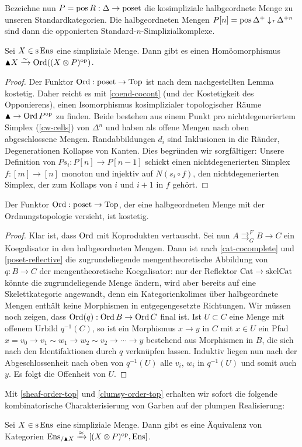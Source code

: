 Bezeichne nun $P = \operatorname{pos} R: \Delta \to \operatorname{poset}$ die kosimpliziale
halbgeordnete Menge zu unseren Standardkategorien. Die halbgeordneten
Mengen $P[n] = \operatorname{pos} \Delta^+ \downarrow \! {\scriptstyle r} \, \Delta^{+n}$ sind dann die
opponierten Standard-$n$-Simplizialkomplexe.
\begin{prop} \label{clumsy-order-top}
  Sei $X \in \operatorname{s}\operatorname{Ens}$ eine simpliziale Menge. Dann gibt es einen
  Homöomorphismus $\blacktriangle X \xrightarrow[]{\sim} \operatorname{Ord}((X \otimes P)^\mathrm{op})$.
\end{prop}
\begin{proof}
  Der Funktor $\operatorname{Ord}: \operatorname{poset} \to \operatorname{Top}$ ist nach dem nachgestellten
  Lemma kostetig. Daher reicht es mit \ref{coend-cocont} (und der
  Kostetigkeit des Opponierens), einen Isomorphismus kosimplizialer
  topologischer Räume $\blacktriangle \to \operatorname{Ord} P^\mathrm{op}$ zu finden. Beide
  bestehen aus einem Punkt pro nichtdegeneriertem Simplex
  (\ref{cw-cells}) von $\Delta^n$ und haben als offene Mengen nach
  oben abgeschlossene Mengen. Randabbildungen $d_i$ sind Inklusionen
  in die Ränder, Degenerationen Kollapse von Kanten. Dies begründen
  wir sorgfältiger: Unsere Definition von $Ps_i: P[n] \to P[n-1]$
  schickt einen nichtdegenerierten Simplex $f: [m] \to [n]$ monoton
  und injektiv auf $N(s_i \circ f)$, den nichtdegenerierten Simplex,
  der zum Kollaps von $i$ und $i+1$ in $f$ gehört.
\end{proof}
\begin{lemma}
  Der Funktor $\operatorname{Ord}: \operatorname{poset} \to \operatorname{Top}$, der eine halbgeordneten Menge
  mit der Ordnungstopologie versieht, ist kostetig.
\end{lemma}
\begin{proof}
    Klar ist, dass $\operatorname{Ord}$ mit Koprodukten vertauscht. Sei nun $A
    \mathrel{\mathop{\rightrightarrows}^{F}_{G}} B \to C$ ein
    Koegalisator in den halbgeordneten Mengen. Dann ist nach
    \ref{cat-cocomplete} und \ref{poset-reflective} die
    zugrundeliegende mengentheoretische Abbildung von $q: B \to C$ der
    mengentheoretische Koegalisator: nur der Reflektor $\operatorname{Cat} \to
    \mathrm{skelCat}$ könnte die zugrundeliegende Menge ändern, wird
    aber bereits auf eine Skelettkategorie angewandt, denn ein
    Kategorienkolimes über halbgeordnete Mengen enthält keine
    Morphismen in entgegengesetzte Richtungen. Wir müssen noch zeigen,
    dass $\operatorname{Ord}(q): \operatorname{Ord} B \to \operatorname{Ord} C$ final ist. Ist $U \subset C$
    eine Menge mit offenem Urbild $q^{-1}(C)$, so ist ein Morphismus
    $x \to y$ in $C$ mit $x \in U$ ein Pfad $x = v_0 \to v_1 \sim w_1
    \to w_2 \sim v_2 \to \cdots \to y$ bestehend aus Morphismen in
    $B$, die sich nach den Identifaktionen durch $q$ verknüpfen
    lassen. Induktiv liegen nun nach der Abgeschlossenheit nach oben
    von $q^{-1}(U)$ alle $v_i$, $w_i$ in $q^{-1}(U)$ und somit auch
    $y$. Es folgt die Offenheit von $U$.
\end{proof}

Mit \ref{sheaf-order-top} und \ref{clumsy-order-top} erhalten wir
sofort die folgende kombinatorische Charakterisierung von Garben auf
der plumpen Realisierung:
\begin{prop} \label{clumsy-comb}
  Sei $X \in \operatorname{s}\operatorname{Ens}$ eine simpliziale Menge. Dann gibt es eine
  Äquivalenz von Kategorien $\operatorname{Ens}_{/\blacktriangle X} \xrightarrow{\approx} [(X
    \otimes P)^\mathrm{op}, \operatorname{Ens}]$.
\end{prop}
